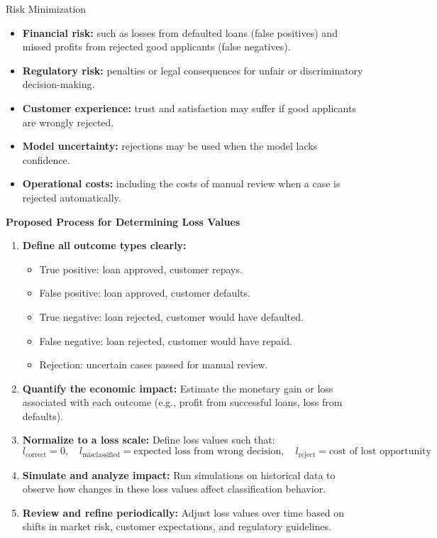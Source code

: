 \documentclass[
	english,
        solution=true
	]{tudaexercise}
\begin{document}
\begin{task}[points=11]{Risk Minimization}
\begin{subtask}[points=5]
\begin{solution}
\begin{itemize}
    \item \textbf{Financial risk:} such as losses from defaulted loans (false positives) and missed profits from rejected good applicants (false negatives).
    \item \textbf{Regulatory risk:} penalties or legal consequences for unfair or discriminatory decision-making.
    \item \textbf{Customer experience:} trust and satisfaction may suffer if good applicants are wrongly rejected.
    \item \textbf{Model uncertainty:} rejections may be used when the model lacks confidence.
    \item \textbf{Operational costs:} including the costs of manual review when a case is rejected automatically.
\end{itemize}

\textbf{Proposed Process for Determining Loss Values}

\begin{enumerate}
    \item \textbf{Define all outcome types clearly:}
    \begin{itemize}
        \item True positive: loan approved, customer repays.
        \item False positive: loan approved, customer defaults.
        \item True negative: loan rejected, customer would have defaulted.
        \item False negative: loan rejected, customer would have repaid.
        \item Rejection: uncertain cases passed for manual review.
    \end{itemize}
    
    \item \textbf{Quantify the economic impact:}
    Estimate the monetary gain or loss associated with each outcome (e.g., profit from successful loans, loss from defaults).
    
    \item \textbf{Normalize to a loss scale:}
    Define loss values such that:
    \[
    l_{\text{correct}} = 0, \quad
    l_{\text{misclassified}} = \text{expected loss from wrong decision}, \quad
    l_{\text{reject}} = \text{cost of lost opportunity}
    \]
    
    \item \textbf{Simulate and analyze impact:}
    Run simulations on historical data to observe how changes in these loss values affect classification behavior.
    
    \item \textbf{Review and refine periodically:}
    Adjust loss values over time based on shifts in market risk, customer expectations, and regulatory guidelines.
\end{enumerate}

\end{solution}
\end{subtask}
\end{task}

\
\end{document}
